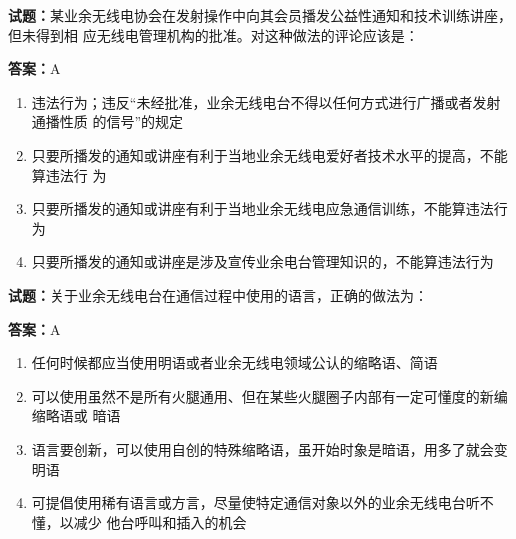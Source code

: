 \documentclass{ctexbook}
\begin{document}





\vspace{1em}

\textbf{试题：}某业余无线电协会在发射操作中向其会员播发公益性通知和技术训练讲座，但未得到相
应无线电管理机构的批准。对这种做法的评论应该是： 

\textbf{答案：}A 

\begin{enumerate}[leftmargin=3em]
  \item 违法行为；违反“未经批准，业余无线电台不得以任何方式进行广播或者发射通播性质
的信号”的规定 

  \item 只要所播发的通知或讲座有利于当地业余无线电爱好者技术水平的提高，不能算违法行
为 

  \item 只要所播发的通知或讲座有利于当地业余无线电应急通信训练，不能算违法行为 

  \item 只要所播发的通知或讲座是涉及宣传业余电台管理知识的，不能算违法行为 

\end{enumerate}





\vspace{1em}

\textbf{试题：}关于业余无线电台在通信过程中使用的语言，正确的做法为： 

\textbf{答案：}A 

\begin{enumerate}[leftmargin=3em]
  \item 任何时候都应当使用明语或者业余无线电领域公认的缩略语、简语 

  \item 可以使用虽然不是所有火腿通用、但在某些火腿圈子内部有一定可懂度的新编缩略语或
暗语 

  \item 语言要创新，可以使用自创的特殊缩略语，虽开始时象是暗语，用多了就会变明语 

  \item 可提倡使用稀有语言或方言，尽量使特定通信对象以外的业余无线电台听不懂，以减少
他台呼叫和插入的机会 

\end{enumerate}
\end{document}
